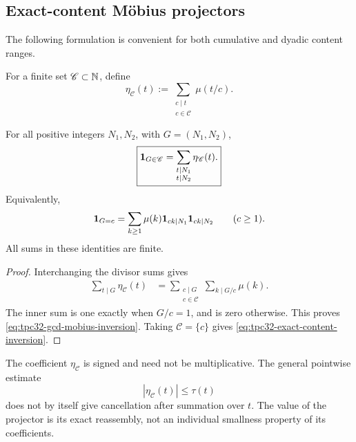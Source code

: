 \subsection{Exact-content M\"obius projectors}

The following formulation is convenient for both cumulative and
dyadic content ranges.

\begin{definition}
\label{def:tpc32-content-projector}
For a finite set \(\mathscr C\subset\mathbb N\), define
\begin{equation}
 \eta_{\mathscr C}(t)
 :=\sum_{\substack{c\mid t\\c\in\mathscr C}}
 \mu(t/c).
 \label{eq:tpc32-content-projector-coefficient}
\end{equation}
\end{definition}

\begin{proposition}
\label{prop:tpc32-gcd-mobius-inversion}
For all positive integers \(N_1,N_2\), with \(G=(N_1,N_2)\),
\begin{equation}
 \boxed{
 \mathbf 1_{G\in\mathscr C}
 =\sum_{\substack{t\mid N_1\\t\mid N_2}}
   \eta_{\mathscr C}(t).}
 \label{eq:tpc32-gcd-mobius-inversion}
\end{equation}
Equivalently,
\begin{equation}
 \mathbf 1_{G=c}
 =\sum_{k\ge1}\mu(k)
   \mathbf 1_{ck\mid N_1}\mathbf 1_{ck\mid N_2}
 \qquad(c\ge1).
 \label{eq:tpc32-exact-content-inversion}
\end{equation}
All sums in these identities are finite.
\end{proposition}

\begin{proof}
Interchanging the divisor sums gives
\begin{align*}
 \sum_{t\mid G}\eta_{\mathscr C}(t)
 &=\sum_{\substack{c\mid G\\c\in\mathscr C}}
   \sum_{k\mid G/c}\mu(k).
\end{align*}
The inner sum is one exactly when \(G/c=1\), and is zero otherwise.
This proves \eqref{eq:tpc32-gcd-mobius-inversion}.  Taking
\(\mathscr C=\{c\}\) gives
\eqref{eq:tpc32-exact-content-inversion}.
\end{proof}

\begin{remark}
The coefficient \(\eta_{\mathscr C}\) is signed and need not be
multiplicative.  The general pointwise estimate
\begin{equation}
 |\eta_{\mathscr C}(t)|\le\tau(t)
 \label{eq:tpc32-projector-trivial-bound}
\end{equation}
does not by itself give cancellation after summation over \(t\).
The value of the projector is its exact reassembly, not an individual
smallness property of its coefficients.
\end{remark}

